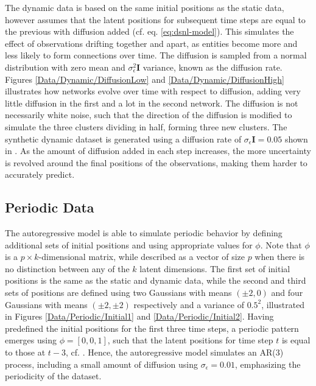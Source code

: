         The dynamic data is based on the same initial positions as the static data, however assumes that the latent positions for subsequent time steps are equal to the previous with diffusion added (cf. eq. \ref{eq:dsnl-model}). This simulates the effect of observations drifting together and apart, as entities become more and less likely to form connections over time. The diffusion is sampled from a normal distribution with zero mean and $\sigma_\epsilon^2\bm{I}$ variance, known as the diffusion rate. Figures \ref{Data/Dynamic/DiffusionLow} and \ref{Data/Dynamic/DiffusionHigh} illustrates how networks evolve over time with respect to diffusion, adding very little diffusion in the first and a lot in the second network.
        The diffusion is not necessarily white noise, such that the direction of the diffusion is modified to simulate the three clusters dividing in half, forming three new clusters.
        The synthetic dynamic dataset is generated using a diffusion rate of $\sigma_\epsilon\bm{I}=0.05$ shown in . 
        As the amount of diffusion added in each step increases, the more uncertainty is revolved around the final positions of the observations, making them harder to accurately predict.
    
    \subsection{Periodic Data}
    
        The autoregressive model is able to simulate periodic behavior by defining additional sets of initial positions and using appropriate values for $\phi$. Note that $\phi$ is a $p\times k$-dimensional matrix, while described as a vector of size $p$ when there is no distinction between any of the $k$ latent dimensions.
        The first set of initial positions is the same as the static and dynamic data, while the second and third sets of positions are defined using two Gaussians with means $(\pm2,0)$ and four Gaussians with means $(\pm2,\pm2)$ respectively and a variance of $0.5^2$, illustrated in Figures \ref{Data/Periodic/Initial1} and \ref{Data/Periodic/Initial2}.
        Having predefined the initial positions for the first three time steps, a periodic pattern emerges using $\phi=[0, 0, 1]$, such that the latent positions for time step $t$ is equal to those at $t-3$, cf. .
        Hence, the autoregressive model simulates an AR(3) process, including a small amount of diffusion using $\sigma_\epsilon=0.01$, emphasizing the periodicity of the dataset.
        
